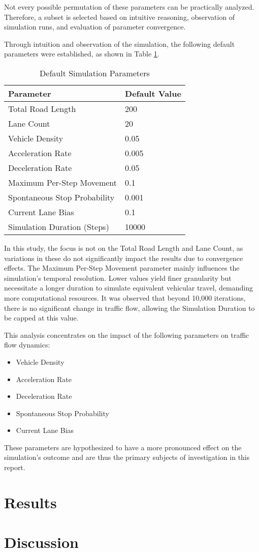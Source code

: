 \documentclass{article}
\begin{document}
Not every possible permutation of these parameters can be practically analyzed. Therefore, a subset is selected based on intuitive reasoning, observation of simulation runs, and evaluation of parameter convergence.

Through intuition and observation of the simulation, the following default parameters were established, as shown in Table \ref{table:default_params}.
\begin{table}[H]
\centering
\begin{tabular}{|l|p{8cm}|}
\hline
\textbf{Parameter}            & \textbf{Default Value}  \\
\hline
Total Road Length             & 200 \\
\hline
Lane Count                    & 20 \\
\hline
Vehicle Density               & 0.05 \\
\hline
Acceleration Rate             & 0.005 \\
\hline
Deceleration Rate             &  0.05 \\
\hline
Maximum Per-Step Movement     &  0.1 \\
\hline
Spontaneous Stop Probability  & 0.001 \\
\hline
Current Lane Bias             & 0.1 \\
\hline
Simulation Duration (Steps)   & 10000 \\
\hline
\end{tabular}
\caption{Default Simulation Parameters}
\label{table:default_params}
\end{table}

In this study, the focus is not on the Total Road Length and Lane Count, as variations in these do not significantly impact the results due to convergence effects. The Maximum Per-Step Movement parameter mainly influences the simulation's temporal resolution. Lower values yield finer granularity but necessitate a longer duration to simulate equivalent vehicular travel, demanding more computational resources. It was observed that beyond 10,000 iterations, there is no significant change in traffic flow, allowing the Simulation Duration to be capped at this value.

This analysis concentrates on the impact of the following parameters on traffic flow dynamics:
\begin{itemize}
\item Vehicle Density
\item Acceleration Rate
\item Deceleration Rate
\item Spontaneous Stop Probability
\item Current Lane Bias
\end{itemize}

These parameters are hypothesized to have a more pronounced effect on the simulation's outcome and are thus the primary subjects of investigation in this report.

\section{Results}



\section{Discussion}
\end{document}
